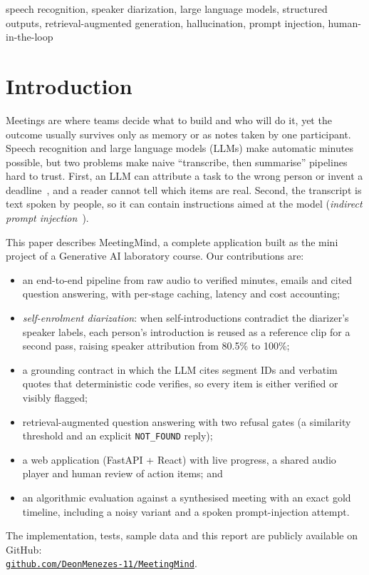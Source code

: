 \documentclass[conference]{IEEEtran}
\newcommand{\repo}{\href{https://github.com/DeonMenezes-11/MeetingMind}{\nolinkurl{github.com/DeonMenezes-11/MeetingMind}}}
\begin{document}
\begin{IEEEkeywords}
speech recognition, speaker diarization, large language models, structured outputs, retrieval-augmented generation,
hallucination, prompt injection, human-in-the-loop
\end{IEEEkeywords}

\section{Introduction}
Meetings are where teams decide what to build and who will do it, yet the outcome usually survives only as memory or as notes
taken by one participant. Speech recognition and large language models (LLMs) make automatic minutes possible, but two problems
make naive ``transcribe, then summarise'' pipelines hard to trust. First, an LLM can attribute a task to the wrong person or
invent a deadline~\cite{ji2023hallucination}, and a reader cannot tell which items are real. Second, the transcript is text
spoken by people, so it can contain instructions aimed at the model (\emph{indirect prompt injection}~\cite{greshake2023}).

This paper describes MeetingMind, a complete application built as the mini project of a Generative AI laboratory course. Our
contributions are:
\begin{itemize}
  \item an end-to-end pipeline from raw audio to verified minutes, emails and cited question answering, with per-stage caching,
        latency and cost accounting;
  \item \emph{self-enrolment diarization}: when self-introductions contradict the diarizer's speaker labels, each person's
        introduction is reused as a reference clip for a second pass, raising speaker attribution from 80.5\% to 100\%;
  \item a grounding contract in which the LLM cites segment IDs and verbatim quotes that deterministic code verifies, so every
        item is either verified or visibly flagged;
  \item retrieval-augmented question answering with two refusal gates (a similarity threshold and an explicit
        \texttt{NOT\_FOUND} reply);
  \item a web application (FastAPI + React) with live progress, a shared audio player and human review of action items; and
  \item an algorithmic evaluation against a synthesised meeting with an exact gold timeline, including a noisy variant and a
        spoken prompt-injection attempt.
\end{itemize}
The implementation, tests, sample data and this report are publicly available on GitHub:\\ \repo.
\end{document}
